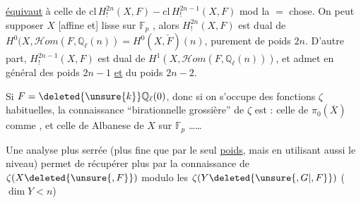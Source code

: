 \uline{équivaut} à celle de $\mathrm{cl}\,H^{2n}_!(X,F)-\mathrm{cl}\,H^{2n-1}_!(X,F)$ mod la $=$ chose. On peut supposer $X$ [affine et] lisse sur $\mathbb F_p$ , alors $H^{2n}_!(X,F)$ est dual de $H^0(X,\mathscr{H}om(F,\mathbb Q_\ell(n))=H^0(X,\check F)(n)$,  purement de poids $2n$. D'autre part, $H^{2n-1}_!(X,F)$ est dual de $H^1(X,\mathscr{H}om(F,\mathbb Q_\ell(n)))$, et admet en général des poids $2n-1$ \uline{et} du poids $2n-2$.

 Si $F=\deleted{\unsure{k}}\mathbb Q_\ell(0)$,  donc  si on s'occupe des fonctions $\zeta$ habituelles, la connaissance ``birationnelle grossière'' de $\zeta$ est   : celle de $\pi_0(\overline X)$ comme , et celle de Albanese de $X$ sur $\mathbb F_p$ \ldots\ldots
{}

Une analyse plus serrée  (plus fine que par le seul \uline{poids}, mais en utilisant aussi le niveau) permet de récupérer plus par la connaissance de $\zeta(X\deleted{\unsure{,F}})$  modulo les $\zeta(Y\deleted{\unsure{,G|,F}})$ ($\dim Y<n$) 
